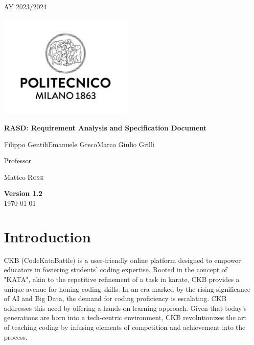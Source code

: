 \documentclass[12pt,oneside,a4paper]{article}
\begin{document}
\begin{titlepage}
    \centering
    {\scshape\large AY 2023/2024 \par}
    \vfill
    \includegraphics[width=0.5\textwidth]{Images/poli.jpg}\par\vspace{1cm}
    \vspace{1.5cm}
    {\huge\bfseries RASD\@: Requirement Analysis
        and Specification Document \par}
    \vspace{2cm}
    {\Large {Filippo Gentili\quad Emanuele Greco\quad Marco Giulio Grilli}\par}
    \vfill
    {\large Professor\par
        Matteo \textsc{Rossi}}
    \vfill
    {\large \textbf{Version 1.2}\\ \today \par}
\end{titlepage}


\renewcommand*\contentsname{Contents}

\renewcommand{\baselinestretch}{0.95}\normalsize
\tableofcontents
\renewcommand{\baselinestretch}{1}\normalsize

\pagebreak


\section{Introduction}
CKB (CodeKataBattle) is a user-friendly online platform designed to empower educators in fostering students' coding expertise. Rooted in the concept of "KATA", akin to the repetitive refinement of a task in karate, CKB provides a unique avenue for honing coding skills.
In an era marked by the rising significance of AI and Big Data, the demand for coding proficiency is escalating. CKB addresses this need by offering a hands-on learning approach.
Given that today's generations are born into a tech-centric environment, CKB revolutionizes the art of teaching coding by infusing elements of competition and achievement into the process.
\end{document}
